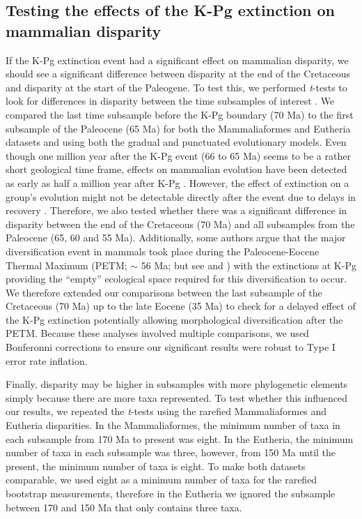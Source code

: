 \subsection{Testing the effects of the K-Pg extinction on mammalian disparity}
If the K-Pg extinction event had a significant effect on mammalian disparity, we should see a significant difference between disparity at the end of the Cretaceous and disparity at the start of the Paleogene.
To test this, we performed \textit{t}-tests to look for differences in disparity between the time subsamples of interest \citep[e.g. as used in][]{anderson2012using,zelditch2012geometric,smith2014joined}.
We compared the last time subsample before the K-Pg boundary (70 Ma) to the first subsample of the Paleocene (65 Ma) for both the Mammaliaformes and Eutheria datasets and using both the gradual and punctuated evolutionary models.
Even though one million year after the K-Pg event (66 to 65 Ma) seems to be a rather short geological time frame, effects on mammalian evolution have been detected as early as half a million year after K-Pg \citep{Wilson2013}.
However, the effect of extinction on a group's evolution might not be detectable directly after the event due to delays in recovery \citep[e.g.][estimated that ecosystems only fully recovered 8-9 Ma after the Permo-Triassic mass extinction]{chen2012timing}.
Therefore, we also tested whether there was a significant difference in disparity between the end of the Cretaceous (70 Ma) and all subsamples from the Paleocene (65, 60 and 55 Ma).
Additionally, some authors argue that the major diversification event in mammals took place during the Paleocene-Eocene Thermal Maximum (PETM; $\sim$ 56 Ma; \citealt{bininda-emondsthe2007} but see \citealt{meredithimpacts2011} and \citealt{Stadler12042011}) with the extinctions at K-Pg providing the ``empty'' ecological space required for this diversification to occur.
We therefore extended our comparisons between the last subsample of the Cretaceous (70 Ma) up to the late Eocene (35 Ma) to check for a delayed effect of the K-Pg extinction potentially allowing morphological diversification after the PETM. 
Because these analyses involved multiple comparisons, we used Bonferonni corrections \citep{holm1979simple} to ensure our significant results were robust to Type I error rate inflation. 

Finally, disparity may be higher in subsamples with more phylogenetic elements simply because there are more taxa represented.
To test whether this influenced our results, we repeated the \textit{t}-tests using the rarefied Mammaliaformes and Eutheria disparities.
In the Mammaliaformes, the minimum number of taxa in each subsample from 170 Ma to present was eight.
In the Eutheria, the minimum number of taxa in each subsample was three, however, from 150 Ma until the present, the minimum number of taxa is eight.
To make both datasets comparable, we used eight as a minimum number of taxa for the rarefied bootstrap measurements, therefore in the Eutheria we ignored the subsample between 170 and 150 Ma that only contains three taxa.

